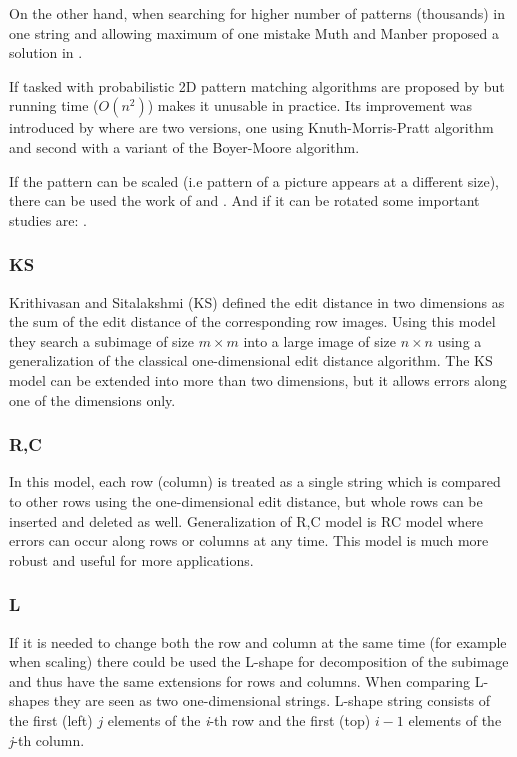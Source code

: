 On the other hand, when searching for higher number of patterns (thousands) in one string and allowing maximum of one mistake Muth and Manber proposed a solution in \cite{1erroronly}.

If tasked with probabilistic 2D pattern matching algorithms are proposed by \cite{kr87} but running time ($O(n^2)$) makes it unusable in practice. Its improvement was introduced by \cite{zt89} where are two versions, one using Knuth-Morris-Pratt algorithm and second with a variant of the Boyer-Moore algorithm.

If the pattern can be scaled (i.e pattern of a picture appears at a different size), there can be used the work of \cite{realscaledmatch} and \cite{alphscalematch}. And if it can be rotated some important studies are: \cite{patternrotation1,patternrotation2,patternrotation3}.

\subsubsection{KS}
Krithivasan and Sitalakshmi (KS) defined the edit distance in two dimensions as the sum of the edit distance of the corresponding row images. Using this model they search a subimage of size $m \times m$ into a large image of size $n \times n$ using a generalization of the classical one-dimensional edit distance algorithm.
The KS model can be extended into more than two dimensions, but it allows errors along one of the dimensions only.
\subsubsection{R,C}
In this model, each row (column) is treated as a single string which is compared to other rows using the one-dimensional edit distance, but 
whole rows can be inserted and deleted as well.
Generalization of R,C model is RC model where errors can occur along rows or columns at any time. This model is much more robust and useful for more applications.
\subsubsection{L}
If it is needed to change both the row and column at the same time (for example when scaling) there could be used the L-shape for decomposition of the subimage and thus have the same extensions for rows and columns. When comparing L-shapes they are seen as two one-dimensional strings. L-shape string consists of the first (left) $j$ elements of the \textit{i}-th row and the first (top) $i-1$ elements of the \textit{j}-th column.

